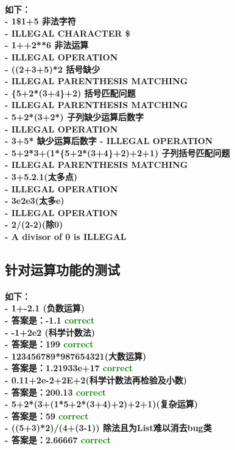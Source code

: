 \documentclass[UTF8]{ctexart}
\begin{document}
\paragraph{
如下：\\
- 1\$1+5  非法字符\\
- ILLEGAL CHARACTER \$ \\
- 1++2**6 非法运算\\
- ILLEGAL OPERATION \\
- ((2+3+5)*2 括号缺少\\
- ILLEGAL PARENTHESIS MATCHING \\
- \{5+2*(3+4\}+2) 括号匹配问题\\
- ILLEGAL PARENTHESIS MATCHING \\
- 5+2*(3+2*) 子列缺少运算后数字\\
- ILLEGAL OPERATION \\
- 3+5* 缺少运算后数字
- ILLEGAL OPERATION\\
- 5+2*3+(1*\{5+2*(3+4\}+2)+2+1) 子列括号匹配问题\\
- ILLEGAL PARENTHESIS MATCHING \\
- 3+5.2.1(太多点)\\
- ILLEGAL OPERATION\\
- 3e2e3(太多e)\\
- ILLEGAL OPERATION \\
- 2/(2-2)(除0)\\
- A divisor of 0 is ILLEGAL
}
\subsection{针对运算功能的测试}
\paragraph{
如下：\\
- 1+-2.1 (负数运算)\\
- 答案是：-1.1 \textcolor{green}{correct}\\
- -1+2e2 (科学计数法)\\
- 答案是：199 \textcolor{green}{correct}\\
- 123456789*987654321(大数运算)\\
- 答案是：1.21933e+17 \textcolor{green}{correct}\\
- 0.11+2e-2+2E+2(科学计数法再检验及小数)\\
- 答案是：200.13 \textcolor{green}{correct}\\
- 5+2*(3+(1*5+2*(3+4)+2)+2+1)(复杂运算)\\
- 答案是：59 \textcolor{green}{correct}\\
- ((5+3)*2)/(4+(3-1)) {除法且为List难以消去bug类}\\
- 答案是：2.66667 \textcolor{green}{correct}
}
\end{document}
